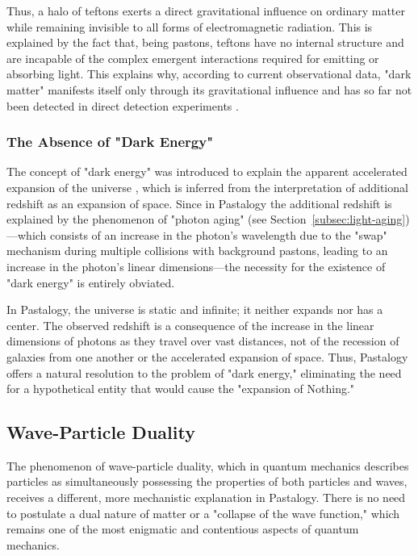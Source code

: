 \documentclass[pdflatex,sn-mathphys-num]{sn-jnl}
\begin{document}
Thus, a halo of teftons exerts a direct gravitational influence on ordinary matter while remaining invisible to all forms of electromagnetic radiation. This is explained by the fact that, being pastons, teftons have no internal structure and are incapable of the complex emergent interactions required for emitting or absorbing light. This explains why, according to current observational data, "dark matter" manifests itself only through its gravitational influence and has so far not been detected in direct detection experiments \cite{bertone2005-review}.

\subsubsection{The Absence of "Dark Energy"}\label{subsubsec:no-dark-energy}

The concept of "dark energy" was introduced to explain the apparent accelerated expansion of the universe \cite{riess1998}, which is inferred from the interpretation of additional redshift as an expansion of space. Since in Pastalogy the additional redshift is explained by the phenomenon of "photon aging" (see Section~\ref{subsec:light-aging})---which consists of an increase in the photon's wavelength due to the "swap" mechanism during multiple collisions with background pastons, leading to an increase in the photon's linear dimensions---the necessity for the existence of "dark energy" is entirely obviated.

In Pastalogy, the universe is static and infinite; it neither expands nor has a center. The observed redshift is a consequence of the increase in the linear dimensions of photons as they travel over vast distances, not of the recession of galaxies from one another or the accelerated expansion of space. Thus, Pastalogy offers a natural resolution to the problem of "dark energy," eliminating the need for a hypothetical entity that would cause the "expansion of Nothing."

\subsection{Wave-Particle Duality}\label{subsec:wave-particle-duality}

The phenomenon of wave-particle duality, which in quantum mechanics describes particles as simultaneously possessing the properties of both particles and waves, receives a different, more mechanistic explanation in Pastalogy. There is no need to postulate a dual nature of matter or a "collapse of the wave function," which remains one of the most enigmatic and contentious aspects of quantum mechanics.
\end{document}
